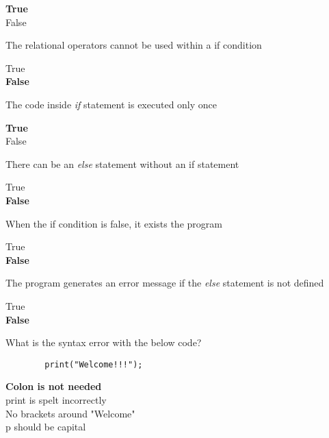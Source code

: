 \documentclass{exam}
\begin{document}
\begin{questions}
      \begin{oneparchoices}
          \choice \textbf{True} \\
          \choice False
      \end{oneparchoices}

      \question The relational operators cannot be used within a if condition
      
      \begin{oneparchoices}
          \choice True \\
          \choice \textbf{False}
      \end{oneparchoices}

      \question The code inside \emph{if} statement is executed only once

      \begin{oneparchoices}
          \choice \textbf{True}\\
          \choice False
      \end{oneparchoices}

      \question There can be an \emph{else} statement without an if statement

      \begin{oneparchoices}
          \choice True\\
          \choice \textbf{False}
      \end{oneparchoices}

      \question When the if condition is false, it exists the program

      \begin{oneparchoices}
          \choice True \\
          \choice \textbf{False}
      \end{oneparchoices}

      \question The program generates an error message if the \emph{else} statement is not defined

      \begin{oneparchoices}
          \choice True \\
          \choice \textbf{False}
      \end{oneparchoices}

      \question What is the syntax error with the below code?

      \begin{verbatim}
        print("Welcome!!!");
      \end{verbatim}

      \begin{oneparchoices}
          \choice \textbf{Colon is not needed} \\
          \choice print is spelt incorrectly \\
          \choice No brackets around "Welcome" \\
          \choice p should be capital 
      \end{oneparchoices}
\end{questions}
\end{document}
